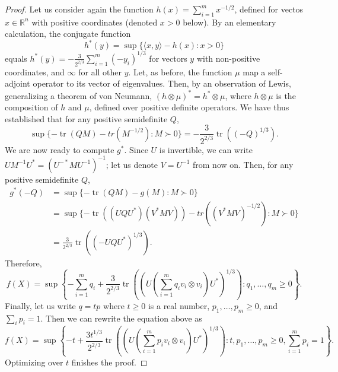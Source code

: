 \documentclass[12pt]{article}
\newcommand{\R}{{\mathbb{R}}}
\DeclareMathOperator{\tr}{tr}
\begin{document}
{\begin{proof}
  Let us consider again the function $h(x) = \sum_{i =
    1}^m{x^{-1/2}}$, defined for vectos $x \in \R^n$ with positive
  coordinates (denoted $x > 0$ below). By an elementary calculation,
  the conjugate function
  \[
  h^*(y) = \sup\{\langle x, y \rangle - h(x): x >0\}
  \]
  equals $h^*(y) = -\frac{3}{2^{2/3}} \sum_{i = 1}^m{(-y_i)^{1/3}}$ for
  vectors $y$ with non-positive coordinates, and $\infty$ for all other
  $y$. Let, as before, the function $\mu$ map a self-adjoint operator
  to its vector of eigenvalues. Then, by an observation of Lewis,
  generalizing a theorem of von Neumann, $(h\otimes \mu)^* = h^*
  \otimes \mu$, where $h\otimes \mu$ is the composition of $h$ and
  $\mu$, defined over positive definite operators. We have thus
  established that for any positive semidefinite $Q$, 
  \[
  \sup\{-\tr(QM) - tr(M^{-1/2}): M \succ 0\}
  = 
 -\frac{3}{2^{2/3}} \tr((-Q)^{1/3}). 
  \]
  We are now ready to compute $g^*$. Since $U$ is invertible, we can
  write $UM^{-1}U^* = (U^{-*}MU^{-1})^{-1}$; let us denote $V =
  U^{-1}$ from now on. Then, for any positive semidefinite $Q$,
  \begin{align*}
    g^*(-Q) &= \sup\{ -\tr(QM) - g(M): M \succ 0\}\\
    &= \sup\{ -\tr((UQU^*)(V^*MV)) - tr((V^*MV)^{-1/2}): M \succ 0\}\\
    &=  \frac{3}{2^{2/3}} \tr((-UQU^*)^{1/3}). 
  \end{align*}
  Therefore,
  \[
  f(X) = \sup\left\{-\sum_{i = 1}^m{q_i} 
    + \frac{3}{2^{2/3}} \tr((U(\sum_{i = 1}^m{q_i  v_i\otimes v_i})U^*)^{1/3}):
    q_1, \ldots, q_m \ge 0\right\}.
  \]
  Finally, let us write $q = tp$ where $t \ge 0$ is a real number,
  $p_1, \ldots, p_m \ge 0$, and $\sum_i p_i = 1$. Then we can rewrite
  the equation above as
  \[
  f(X) = \sup\left\{-t
    + \frac{3t^{1/3}}{2^{2/3}} \tr((U(\sum_{i = 1}^m{p_i  v_i\otimes v_i})U^*)^{1/3}):
    t, p_1, \ldots, p_m \ge 0, \sum_{i=1}^m p_i = 1\right\}.
  \]
  Optimizing over $t$ finishes the proof. 
\end{proof}

}
\end{document}
